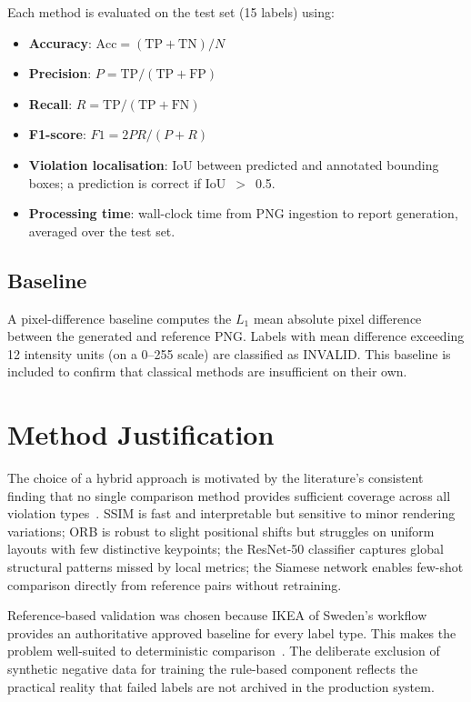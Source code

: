 Each method is evaluated on the test set (15 labels) using:

\begin{itemize}
  \item \textbf{Accuracy}: $\text{Acc} = (\text{TP}+\text{TN})/N$
  \item \textbf{Precision}: $P = \text{TP}/(\text{TP}+\text{FP})$
  \item \textbf{Recall}: $R = \text{TP}/(\text{TP}+\text{FN})$
  \item \textbf{F1-score}: $F1 = 2PR/(P+R)$
  \item \textbf{Violation localisation}: IoU between predicted and annotated bounding
  boxes; a prediction is correct if IoU~$>$~0.5.
  \item \textbf{Processing time}: wall-clock time from PNG ingestion to report
  generation, averaged over the test set.
\end{itemize}

\subsection{Baseline}

A pixel-difference baseline computes the $L_1$ mean absolute pixel difference between
the generated and reference PNG. Labels with mean difference exceeding 12 intensity
units (on a 0–255 scale) are classified as INVALID. This baseline is included to
confirm that classical methods are insufficient on their own.

\section{Method Justification}
\label{sec:justification}

The choice of a hybrid approach is motivated by the literature's consistent finding that
no single comparison method provides sufficient coverage across all violation
types~\cite{zhang2018lpips, roth2022patchcore}. SSIM is fast and interpretable but
sensitive to minor rendering variations; ORB is robust to slight positional shifts but
struggles on uniform layouts with few distinctive keypoints; the ResNet-50 classifier
captures global structural patterns missed by local metrics; the Siamese network enables
few-shot comparison directly from reference pairs without retraining.

Reference-based validation was chosen because IKEA of Sweden's workflow provides
an authoritative approved baseline for every label type. This makes the problem
well-suited to deterministic comparison~\cite{bergmann2019mvtec}. The deliberate
exclusion of synthetic negative data for training the rule-based component reflects
the practical reality that failed labels are not archived in the production system.
